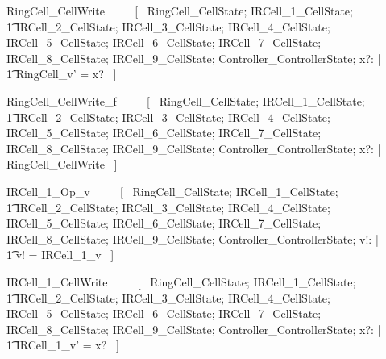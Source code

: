 \documentclass{article}
\begin{document}
\begin{zed}
RingCell\_CellWrite ~~~~ [~ 
    \Delta RingCell\_CellState; 
    \Xi IRCell\_1\_CellState; \\
    \t1 \Xi IRCell\_2\_CellState; 
    \Xi IRCell\_3\_CellState;
    \Xi IRCell\_4\_CellState; 
    \Xi IRCell\_5\_CellState; 
    \Xi IRCell\_6\_CellState; 
    \Xi IRCell\_7\_CellState; 
    \Xi IRCell\_8\_CellState; 
    \Xi IRCell\_9\_CellState; 
    \Xi Controller\_ControllerState; 
    x?: \nat | \\
    \t1 RingCell\_v' = x? ~] \\
\end{zed}

\begin{zed}
RingCell\_CellWrite\_f ~~~~ [~ 
    \Xi RingCell\_CellState; 
    \Xi IRCell\_1\_CellState; \\
    \t1 \Xi IRCell\_2\_CellState; 
    \Xi IRCell\_3\_CellState;
    \Xi IRCell\_4\_CellState; 
    \Xi IRCell\_5\_CellState; 
    \Xi IRCell\_6\_CellState; 
    \Xi IRCell\_7\_CellState; 
    \Xi IRCell\_8\_CellState; 
    \Xi IRCell\_9\_CellState; 
    \Xi Controller\_ControllerState; 
    x?: \nat | \\
    \lnot \pre RingCell\_CellWrite ~] \\
\end{zed}

\begin{zed}
IRCell\_1\_Op\_v ~~~~ [~ 
    \Xi RingCell\_CellState; 
    \Xi IRCell\_1\_CellState; \\
    \t1 \Xi IRCell\_2\_CellState; 
    \Xi IRCell\_3\_CellState;
    \Xi IRCell\_4\_CellState; 
    \Xi IRCell\_5\_CellState; 
    \Xi IRCell\_6\_CellState; 
    \Xi IRCell\_7\_CellState; 
    \Xi IRCell\_8\_CellState; 
    \Xi IRCell\_9\_CellState; 
    \Xi Controller\_ControllerState; v!: \nat | \\
    \t1 v! = IRCell\_1\_v ~] \\
\end{zed}

\begin{zed}
IRCell\_1\_CellWrite ~~~~ [~ 
    \Xi RingCell\_CellState; 
    \Delta IRCell\_1\_CellState; \\
    \t1 \Xi IRCell\_2\_CellState; 
    \Xi IRCell\_3\_CellState;
    \Xi IRCell\_4\_CellState; 
    \Xi IRCell\_5\_CellState; 
    \Xi IRCell\_6\_CellState; 
    \Xi IRCell\_7\_CellState; 
    \Xi IRCell\_8\_CellState; 
    \Xi IRCell\_9\_CellState; 
    \Xi Controller\_ControllerState; 
    x?: \nat | \\
    \t1 IRCell\_1\_v' = x? ~] \\
\end{zed}
\end{document}
